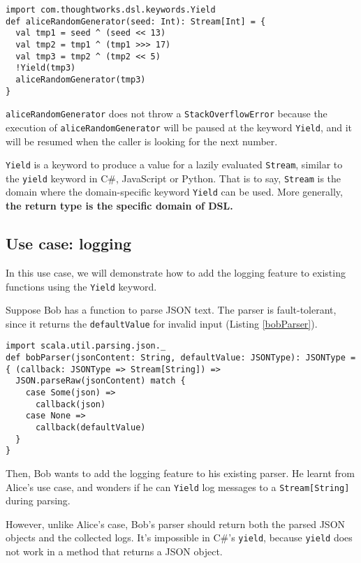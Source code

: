 \begin{lstlisting}[float={h t b p},caption={The implementation of Alice's pseudo-random number generator},label={generatedNumbers}]
import com.thoughtworks.dsl.keywords.Yield
def aliceRandomGenerator(seed: Int): Stream[Int] = {
  val tmp1 = seed ^ (seed << 13)
  val tmp2 = tmp1 ^ (tmp1 >>> 17)
  val tmp3 = tmp2 ^ (tmp2 << 5)
  !Yield(tmp3)
  aliceRandomGenerator(tmp3)
}
\end{lstlisting}

\lstinline{aliceRandomGenerator} does not throw a \lstinline{StackOverflowError} because the execution of \lstinline{aliceRandomGenerator} will be paused at the keyword \lstinline{Yield}, and it will be resumed when the caller is looking for the next number.

\lstinline{Yield} is a keyword to produce a value for a lazily evaluated \lstinline{Stream}, similar to the \lstinline{yield} keyword in C\#, JavaScript or Python. That is to say, \lstinline{Stream} is the domain where the domain-specific keyword \lstinline{Yield} can be used. More generally, \textbf{the return type is the specific domain of DSL.}

\subsection{Use case: logging}

In this use case, we will demonstrate how to add the logging feature to existing functions using the \lstinline{Yield} keyword.

Suppose Bob has a function to parse JSON text. The parser is fault-tolerant, since it returns the \lstinline{defaultValue} for invalid input  (Listing \ref{bobParser}).

\begin{lstlisting}[float={h t b p},caption={The original implementation of Bob's parser},label={bobParser}]
import scala.util.parsing.json._
def bobParser(jsonContent: String, defaultValue: JSONType): JSONType = { (callback: JSONType => Stream[String]) =>
  JSON.parseRaw(jsonContent) match {
    case Some(json) =>
      callback(json)
    case None =>
      callback(defaultValue)
  }
}
\end{lstlisting}

Then, Bob wants to add the logging feature to his existing parser. He learnt from Alice's use case, and wonders if he can \lstinline{Yield} log messages to a \lstinline{Stream[String]} during parsing.

However, unlike Alice's case, Bob's parser should return both the parsed JSON objects and the collected logs. It's impossible in C\#'s \lstinline{yield}, because \lstinline{yield} does not work in a method that returns a JSON object.

